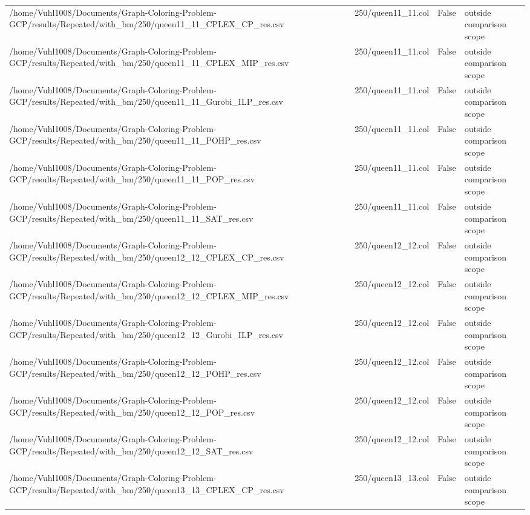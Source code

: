 \begin{table}[htbp]
\begin{tabular}{llll}
/home/Vuhl1008/Documents/Graph-Coloring-Problem-GCP/results/Repeated/with\_bm/250/queen11\_11\_CPLEX\_CP\_res.csv & 250/queen11\_11.col & False & outside comparison scope \\
/home/Vuhl1008/Documents/Graph-Coloring-Problem-GCP/results/Repeated/with\_bm/250/queen11\_11\_CPLEX\_MIP\_res.csv & 250/queen11\_11.col & False & outside comparison scope \\
/home/Vuhl1008/Documents/Graph-Coloring-Problem-GCP/results/Repeated/with\_bm/250/queen11\_11\_Gurobi\_ILP\_res.csv & 250/queen11\_11.col & False & outside comparison scope \\
/home/Vuhl1008/Documents/Graph-Coloring-Problem-GCP/results/Repeated/with\_bm/250/queen11\_11\_POHP\_res.csv & 250/queen11\_11.col & False & outside comparison scope \\
/home/Vuhl1008/Documents/Graph-Coloring-Problem-GCP/results/Repeated/with\_bm/250/queen11\_11\_POP\_res.csv & 250/queen11\_11.col & False & outside comparison scope \\
/home/Vuhl1008/Documents/Graph-Coloring-Problem-GCP/results/Repeated/with\_bm/250/queen11\_11\_SAT\_res.csv & 250/queen11\_11.col & False & outside comparison scope \\
/home/Vuhl1008/Documents/Graph-Coloring-Problem-GCP/results/Repeated/with\_bm/250/queen12\_12\_CPLEX\_CP\_res.csv & 250/queen12\_12.col & False & outside comparison scope \\
/home/Vuhl1008/Documents/Graph-Coloring-Problem-GCP/results/Repeated/with\_bm/250/queen12\_12\_CPLEX\_MIP\_res.csv & 250/queen12\_12.col & False & outside comparison scope \\
/home/Vuhl1008/Documents/Graph-Coloring-Problem-GCP/results/Repeated/with\_bm/250/queen12\_12\_Gurobi\_ILP\_res.csv & 250/queen12\_12.col & False & outside comparison scope \\
/home/Vuhl1008/Documents/Graph-Coloring-Problem-GCP/results/Repeated/with\_bm/250/queen12\_12\_POHP\_res.csv & 250/queen12\_12.col & False & outside comparison scope \\
/home/Vuhl1008/Documents/Graph-Coloring-Problem-GCP/results/Repeated/with\_bm/250/queen12\_12\_POP\_res.csv & 250/queen12\_12.col & False & outside comparison scope \\
/home/Vuhl1008/Documents/Graph-Coloring-Problem-GCP/results/Repeated/with\_bm/250/queen12\_12\_SAT\_res.csv & 250/queen12\_12.col & False & outside comparison scope \\
/home/Vuhl1008/Documents/Graph-Coloring-Problem-GCP/results/Repeated/with\_bm/250/queen13\_13\_CPLEX\_CP\_res.csv & 250/queen13\_13.col & False & outside comparison scope \\

\end{tabular}
\end{table}
